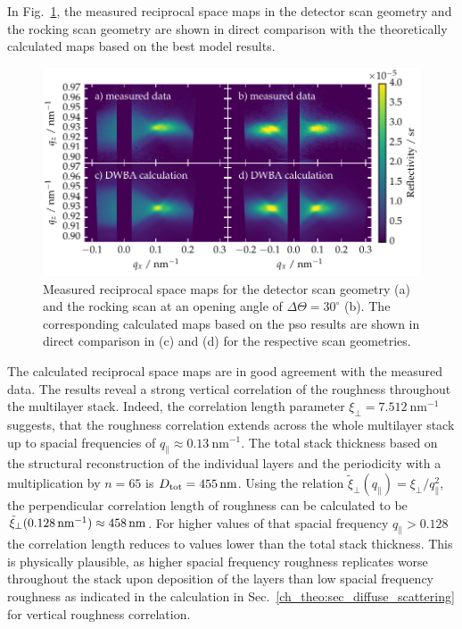 In Fig.~\ref{ch_diff:fig_PTB17_diffuse_comparisonWithTheory}, the measured reciprocal space maps in the detector scan geometry and the rocking scan geometry are shown in direct comparison with the theoretically calculated maps based on the best model results. 
\begin{figure}[htbp]
        \includegraphics[width=
        \textwidth]{img/PTB17_diffuse_simulation_vs_measurement} \caption[Measured  reciprocal space maps for the detector scan geometry and the rocking scan geometry.]{Measured  reciprocal space maps for the detector scan geometry (a) and the rocking scan at an opening angle of $\Delta\Theta=30^\circ$ (b). The corresponding calculated maps based on the \gls{pso} results are shown in direct comparison in (c) and (d) for the respective scan geometries.} \label{ch_diff:fig_PTB17_diffuse_comparisonWithTheory} 
\end{figure}

The calculated reciprocal space maps are in good agreement with the measured data. The results reveal a strong vertical correlation of the roughness throughout the multilayer stack. Indeed, the correlation length parameter $\xi_\perp = \SI{7.512}{\nano\meter^{-1}}$ suggests, that the roughness correlation extends across the whole multilayer stack up to spacial frequencies of $q_\parallel \approx \SI{0.13}{\nano\meter^{-1}}$. The total stack thickness based on the structural reconstruction of the individual layers and the periodicity with a multiplication by $n=65$ is $D_\text{tot} = \nm{455}$. Using the relation $\tilde{\xi}_\perp(q_\parallel) = \xi_\perp / q_\parallel^2$, the perpendicular correlation length of roughness can be calculated to be $\tilde{\xi}_\perp(\SI{0.128}{\nano\meter^{-1}}) \approx \nm{458}$. For higher values of that spacial frequency $q_\parallel > 0.128$ the correlation length reduces to values lower than the total stack thickness. This is physically plausible, as higher spacial frequency roughness replicates worse throughout the stack upon deposition of the layers than low spacial frequency roughness as indicated in the calculation in Sec.~\ref{ch_theo:sec_diffuse_scattering} for vertical roughness correlation.

